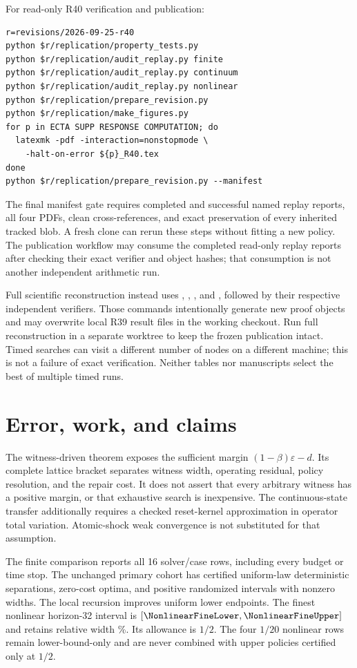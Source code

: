 For read-only R40 verification and publication:
\begin{verbatim}
r=revisions/2026-09-25-r40
python $r/replication/property_tests.py
python $r/replication/audit_replay.py finite
python $r/replication/audit_replay.py continuum
python $r/replication/audit_replay.py nonlinear
python $r/replication/prepare_revision.py
python $r/replication/make_figures.py
for p in ECTA SUPP RESPONSE COMPUTATION; do
  latexmk -pdf -interaction=nonstopmode \
    -halt-on-error ${p}_R40.tex
done
python $r/replication/prepare_revision.py --manifest
\end{verbatim}
The final manifest gate requires completed and successful named replay reports, all four PDFs, clean cross-references, and exact preservation of every inherited tracked blob. A fresh clone can rerun these steps without fitting a new policy. The publication workflow may consume the completed read-only replay reports after checking their exact verifier and object hashes; that consumption is not another independent arithmetic run.

Full scientific reconstruction instead uses , , , and , followed by their respective independent verifiers. Those commands intentionally generate new proof objects and may overwrite local R39 result files in the working checkout. Run full reconstruction in a separate worktree to keep the frozen publication intact. Timed searches can visit a different number of nodes on a different machine; this is not a failure of exact verification. Neither tables nor manuscripts select the best of multiple timed runs.

\section{Error, work, and claims}
The witness-driven theorem exposes the sufficient margin $(1-\beta)\varepsilon-d$. Its complete lattice bracket separates witness width, operating residual, policy resolution, and the repair cost. It does not assert that every arbitrary witness has a positive margin, or that exhaustive search is inexpensive. The continuous-state transfer additionally requires a checked reset-kernel approximation in operator total variation. Atomic-shock weak convergence is not substituted for that assumption.

The finite comparison reports all 16 solver/case rows, including every budget or time stop. The unchanged primary cohort has \PrimaryStrict{} certified uniform-law deterministic separations, \PrimaryZero{} zero-cost optima, and \PrimaryPositive{} positive randomized intervals with nonzero widths. The local recursion improves \LocalImproveCount{} uniform lower endpoints. The finest nonlinear horizon-32 interval is $[\NonlinearFineLower,\NonlinearFineUpper]$ and retains relative width \NonlinearFineRelative\%. Its allowance is $1/2$. The four $1/20$ nonlinear rows remain lower-bound-only and are never combined with upper policies certified only at $1/2$.


